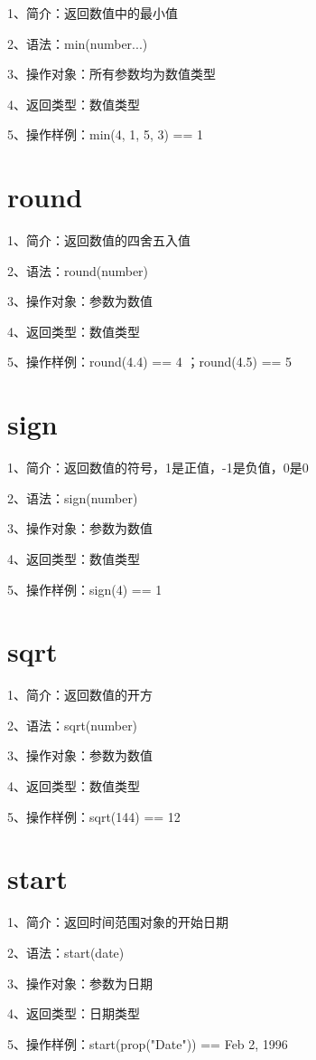 1、简介：返回数值中的最小值

2、语法：min(number...)

3、操作对象：所有参数均为数值类型

4、返回类型：数值类型

5、操作样例：min(4, 1, 5, 3) == 1

\section{round}

1、简介：返回数值的四舍五入值

2、语法：round(number)

3、操作对象：参数为数值

4、返回类型：数值类型

5、操作样例：round(4.4) == 4 ；round(4.5) == 5

\section{sign}

1、简介：返回数值的符号，1是正值，-1是负值，0是0

2、语法：sign(number)

3、操作对象：参数为数值

4、返回类型：数值类型

5、操作样例：sign(4) == 1

\section{sqrt}

1、简介：返回数值的开方

2、语法：sqrt(number)

3、操作对象：参数为数值

4、返回类型：数值类型

5、操作样例：sqrt(144) == 12

\section{start}

1、简介：返回时间范围对象的开始日期

2、语法：start(date)

3、操作对象：参数为日期

4、返回类型：日期类型

5、操作样例：start(prop("Date")) == Feb 2, 1996

